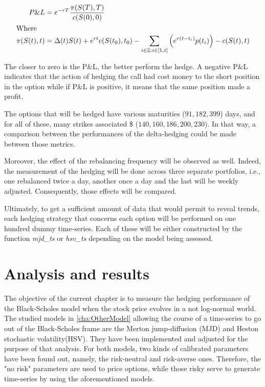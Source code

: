 \documentclass[12pt,a4paper]{report}
\begin{document}
\begin{align}
  P\&L &= e^{-rT} \frac{\pi(S(T), T)}{c(S(0), 0)} \label{eq:below}\\
  \intertext{Where}
  \pi(S(t), t) &= \Delta(t)S(t) + e^{rt} c(S(t_0), t_0)
    - \sum_{i \in \mathbb{Z} : i \in \left [1, t \right ]} \left( e^{r(t-t_i)} p(t_i) \right) - c(S(t), t)
\end{align}


The closer to zero is the P\&L, the better perform the hedge.
A negative P\&L indicates that the action of hedging the call had cost money to the short position in the option while if P\&L is positive, it means that the same position made a profit.

The options that will be hedged have various maturities (${91, 182, 399}$) days, and for all of these, many strikes associated \$ (${140, 160, 186, 200, 230}$).
In that way, a comparison between the performances of the delta-hedging could be made between those metrics.

Moreover, the effect of the rebalancing frequency will be observed as well.
Indeed, the measurement of the hedging will be done across three separate portfolios, i.e., one rebalanced twice a day, another once a day and the last will be weekly adjusted.
Consequently, those effects will be compared.

Ultimately, to get a sufficient amount of data that would permit to reveal trends, each hedging strategy that concerns each option will be performed on one hundred dummy time-series.
Each of these will be either constructed by the function \textit{mjd\_ts} or \textit{hsv\_ts} depending on the model being assessed.





















\chapter{Analysis and results}
\label{cha:analysis}

The objective of the current chapter is to measure the hedging performance of the Black-Scholes model when the stock price evolves in a not log-normal world.
The studied models in \cref{cha:OtherModel} allowing the course of a time-series to go out of the Black-Scholes frame are the Merton jump-diffusion (MJD) and Heston stochastic volatility(HSV).
They have been implemented and adjusted for the purpose of that analysis. 
For both models, two kinds of calibrated parameters have been found out, namely, the risk-neutral and risk-averse ones. 
Therefore, the "no risk" parameters are used to price options, while those risky serve to generate time-series by using the aforementioned models.
\end{document}
